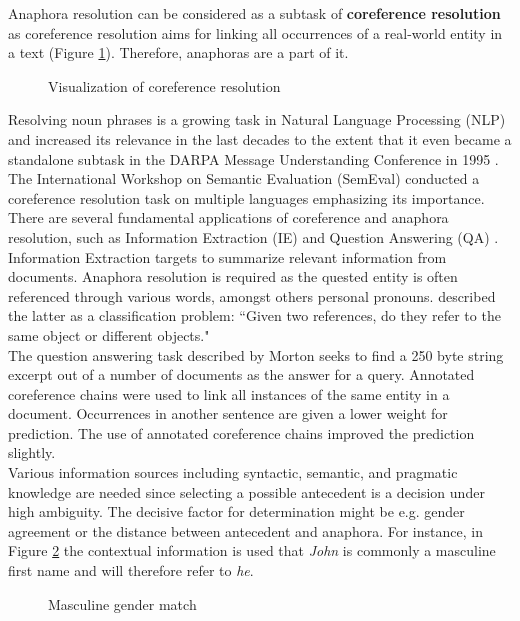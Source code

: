 Anaphora resolution can be considered as a subtask of \textbf{coreference resolution} as coreference resolution aims for linking all occurrences of a real-world entity in a text (Figure \ref{figure:visofcoref}). Therefore, anaphoras are a part of it. 

\begin{figure}[h]
	\centering\sffamily
		\caption{Visualization of coreference resolution}
	\label{figure:visofcoref}
\end{figure}

Resolving noun phrases is a growing task in Natural Language Processing (NLP) and increased its relevance in the last decades to the extent that it even became a standalone subtask in the DARPA Message Understanding Conference in 1995 \citep{chinchor1995message}. The International Workshop on Semantic Evaluation (SemEval) conducted a coreference resolution task on multiple languages \citep{recasens2010semeval} emphasizing its importance. 
There are several fundamental applications of coreference and anaphora resolution, such as Information Extraction (IE) \citep{mccarthy1995using} and Question Answering (QA) \citep{morton2000coreference}.\\ 
Information Extraction targets to summarize relevant information from documents. Anaphora resolution is required as the quested entity is often referenced through various words, amongst others personal pronouns. \cite{mccarthy1995using} described the latter as a classification problem: “Given two references, do they refer to the same object or different objects."\\
The question answering task described by Morton seeks to find a 250 byte string excerpt out of a number of documents as the answer for a query. Annotated coreference chains were used to link all instances of the same entity in a document. Occurrences in another sentence are given a lower weight for prediction. The use of annotated coreference chains improved the prediction slightly.\\
Various information sources including syntactic, semantic, and pragmatic knowledge are needed since selecting a possible antecedent is a decision under high ambiguity. The decisive factor for determination might be e.g. gender agreement or the distance between antecedent and anaphora. For instance, in Figure \ref{figure:mascmatch} the contextual information is used that \textit{John} is commonly a masculine first name and will therefore refer to \textit{he}.
\begin{figure}[h]
\centering\sffamily
\caption{Masculine gender match}
	\label{figure:mascmatch}
\end{figure}

